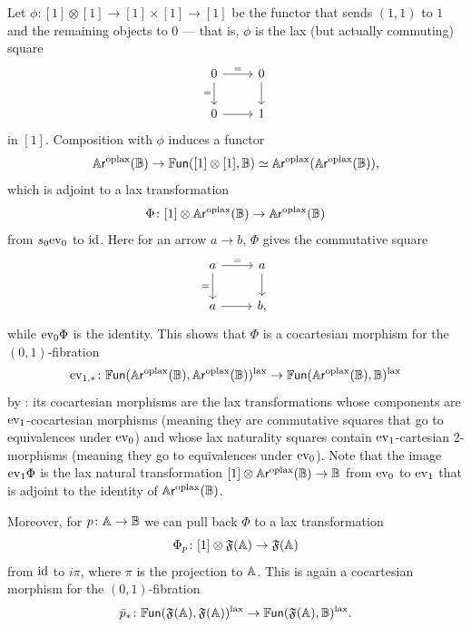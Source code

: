 \documentclass[a4paper,11pt]{article}
\newcommand{\FFr}{\mathfrak{F}}
\begin{document}
\begin{observation}\label{obs:free fib canonical lax tr}
  Let $\phi \colon [1] \otimes [1] \to [1] \times [1] \to [1]$ be the
  functor that sends $(1,1)$ to $1$ and the remaining objects to
  $0$ --- that is, $\phi$ is the lax (but actually commuting) square
  \[
    \begin{tikzcd}
     0 \ar[r, "="] \ar[d, "="'] & 0  \ar[d] \\
     0 \ar[r] & 1
    \end{tikzcd}
  \]
  in $[1]$. Composition with $\phi$ induces a functor
  \[ \ARopl(\tB) \to \FUN([1] \otimes [1], \tB) \simeq
    \ARopl(\ARopl(\tB)),\]
  which is adjoint to a lax transformation
  \[ \Phi\colon [1] \otimes \ARopl(\tB) \to \ARopl(\tB)\]
  from $s_{0}\text{\textup{ev}}_{0}$ to $\text{\textup{id}}$.
  Here for an arrow $a \to b$, $\Phi$ gives the commutative square
  \[
    \begin{tikzcd}
     a \ar[r, "="] \ar[d, "="'] & a  \ar[d] \\
     a \ar[r] & b, 
    \end{tikzcd}
  \]
  while $\text{\textup{ev}}_{0}\Phi$ is the identity. This shows that $\Phi$ is a
  cocartesian morphism for the $(0,1)$-fibration
  \[ \ev_{1,*} \colon \FUN(\ARopl(\tB),\ARopl(\tB))^{\lax} \to
    \FUN(\ARopl(\tB), \tB)^{\lax}\]
  by \cite[Corollary
  3.5.1]{decorated}: its  cocartesian morphisms are the lax
  transformations whose components are $\text{\textup{ev}}_{1}$-cocartesian morphisms
  (meaning they are commutative squares that go to equivalences under
  $\text{\textup{ev}}_{0}$) and whose lax naturality squares contain
  $\text{\textup{ev}}_{1}$-cartesian 2-morphisms (meaning they go to equivalences
  under $\text{\textup{ev}}_{0}$). Note that the image $\text{\textup{ev}}_{1}\Phi$ is the lax
  natural transformation $[1] \otimes \ARopl(\tB) \to \tB$ from
  $\text{\textup{ev}}_{0}$ to $\text{\textup{ev}}_{1}$ that is adjoint to the identity of
  $\mathbb{A}\mkern-0.5mu\textsf{\textup{r}}^{\text{\textup{oplax}}}(\mathbb{B})$.

  Moreover, for $p \colon \tA \to \tB$ we can
  pull
  back $\Phi$ to a lax transformation
  \[ \Phi_{p} \colon [1] \otimes \FFr(\tA) \to \FFr(\tA)\]
  from $\text{\textup{id}}$ to $i\pi$, where $\pi$ is the projection to
  $\mathbb{A}$. This is again a cocartesian morphism for the
  $(0,1)$-fibration
  \[ \bar{p}_{*} \colon \FUN(\FFr(\tA), \FFr(\tA))^{\lax} \to
    \FUN(\FFr(\tA), \tB)^{\lax}. \]
\end{observation}
\end{document}
